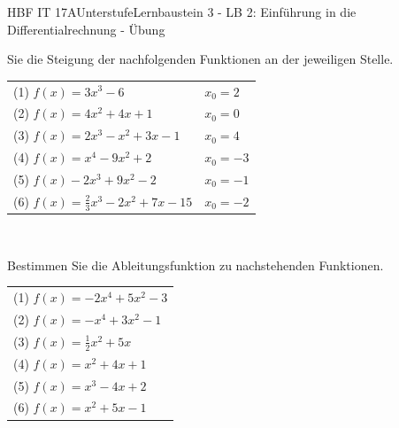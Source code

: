 \documentclass[oneside,openany,headings=optiontotoc,11pt,numbers=noenddot]{scrreprt}
\begin{document}
\begin{worksheet}{HBF IT 17A}{Unterstufe}{Lernbaustein 3 - LB 2: Einführung in die Differentialrechnung - Übung}
\begin{framed}
Sie die Steigung der nachfolgenden Funktionen an der jeweiligen Stelle.\\
			\par\noindent
			\begin{tabular}{ll}
				(1) \(f(x) = 3x^3-6\) & \(x_0 = 2\) \\
				(2) \(f(x) = 4x^2 +4x +1\) & \( x_0 = 0\)\\
				(3) \(f(x) = 2x^3-x^2+3x-1\) & \(x_0 = 4\)\\
				(4) \(f(x) = x^4-9x^2+2\) & \(x_0 = -3\)\\
				(5) \(f(x)-2x^3+9x^2-2\) & \(x_0=-1\)\\
				(6) \(f(x) = \frac{2}{3}x^3 -2x^2+7x -15\) & \(x_0=-2\)
			\end{tabular}\\
			\par\bigskip\noindent
			Bestimmen Sie die Ableitungsfunktion zu nachstehenden Funktionen.\\
			\par\noindent
			\begin{tabular}{l}
				(1) \(f(x) = -2x^4+5x^2-3\)\\
				(2) \(f(x) = -x^4+3x^2-1\)\\
				(3) \(f(x) = \frac{1}{2}x^2+5x\)\\
				(4) \(f(x) = x^2 + 4x +1\)\\
				(5) \(f(x) = x^3-4x+2\)\\
				(6) \(f(x) = x^2+5x-1\)
			\end{tabular}
		\end{framed}
	\end{worksheet}
\end{document}
